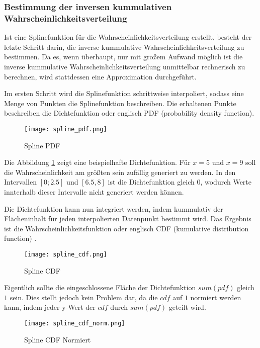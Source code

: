 \subsubsection{Bestimmung der inversen kummulativen Wahrscheinlichkeitsverteilung}

Ist eine Splinefunktion für die Wahrscheinlichkeitsverteilung erstellt, besteht der letzte Schritt darin, die inverse kummulative Wahrscheinlichkeitsverteilung zu bestimmen. Da es, wenn überhaupt, nur mit großem Aufwand möglich ist die inverse kummulative Wahrscheinlichkeitsverteilung unmittelbar rechnerisch zu berechnen, wird stattdessen eine Approximation durchgeführt. 

Im ersten Schritt wird die Splinefunktion schrittweise interpoliert, sodass eine Menge von Punkten die Splinefunktion beschreiben. Die erhaltenen Punkte beschreiben die Dichtefunktion oder englisch PDF (probability density function). 

\begin{figure}[H]
    \centering
    \texttt{[image: spline\_pdf.png]}
    \caption{Spline PDF}\label{fig:pdf}
\end{figure}

Die Abbildung \ref{fig:pdf} zeigt eine beispielhafte Dichtefunktion. Für $x=5$ und $x=9$ soll die Wahrscheinlichkeit am größten sein zufällig generiert zu werden. In den Intervallen $[0;2.5]$ und $[6.5,8]$ ist die Dichtefunktion gleich $0$, wodurch Werte innterhalb dieser Intervalle nicht generiert werden können.

Die Dichtefunktion kann nun integriert werden, indem  kummulativ der Flächeninhalt für jeden interpolierten Datenpunkt bestimmt wird. Das Ergebnis ist die Wahrscheinlichkeitsfunktion oder englisch CDF (kumulative distribution function) \cite{denker:2008}.

\begin{figure}[H]
    \centering
    \texttt{[image: spline\_cdf.png]}
    \caption{Spline CDF}\label{fig:cdf}
\end{figure}

Eigentlich sollte die eingeschlossene Fläche der Dichtefunktion $sum(pdf)$ gleich $1$ sein. Dies stellt jedoch kein Problem dar, da die $cdf$ auf $1$ normiert werden kann, indem jeder y-Wert der $cdf$ durch $sum(pdf)$ geteilt wird.

\begin{figure}[H]
    \centering
    \texttt{[image: spline\_cdf\_norm.png]}
    \caption{Spline CDF Normiert}\label{fig:cdfnorm}
\end{figure}

